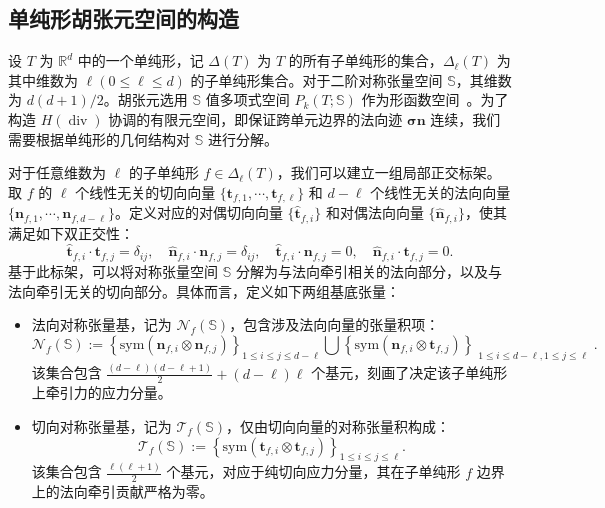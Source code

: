 \subsection{单纯形胡张元空间的构造}
\label{subsec:hz_space_construct}

设 $T$ 为 $\mathbb{R}^d$ 中的一个单纯形，记 $\Delta({T})$ 为 $T$ 的所有子单纯形的集合，$\Delta_{\ell}(T)$ 为其中维数为 $\ell(0\leq\ell\leq{d})$ 的子单纯形集合。对于二阶对称张量空间 $\mathbb{S}$，其维数为 $d(d+1)/2$。胡张元选用 $\mathbb{S}$ 值多项式空间 $P_k(T; \mathbb{S})$ 作为形函数空间~\cite{huFiniteElementApproximations2015}。为了构造 $H(\operatorname{div})$ 协调的有限元空间，即保证跨单元边界的法向迹 $\boldsymbol{\sigma}\boldsymbol{n}$ 连续，我们需要根据单纯形的几何结构对 $\mathbb{S}$ 进行分解。

对于任意维数为 $\ell$ 的子单纯形 $f \in \Delta_{\ell}(T)$，我们可以建立一组局部正交标架。取 $f$ 的 $\ell$ 个线性无关的切向向量 $\{\boldsymbol{t}_{f,1}, \cdots, \boldsymbol{t}_{f,\ell}\}$ 和 $d-\ell$ 个线性无关的法向向量 $\{\boldsymbol{n}_{f,1}, \cdots, \boldsymbol{n}_{f,d-\ell}\}$。定义对应的对偶切向向量 $\{\hat{\boldsymbol{t}}_{f,i}\}$ 和对偶法向向量 $\{\hat{\boldsymbol{n}}_{f,i}\}$，使其满足如下双正交性：
\[
\hat{\boldsymbol{t}}_{f, i} \cdot \boldsymbol{t}_{f, j} = \delta_{ij}, \quad \hat{\boldsymbol{n}}_{f, i} \cdot \boldsymbol{n}_{f, j} = \delta_{ij}, \quad \hat{\boldsymbol{t}}_{f, i} \cdot \boldsymbol{n}_{f, j} = 0, \quad \hat{\boldsymbol{n}}_{f, i} \cdot \boldsymbol{t}_{f, j} = 0.
\]
基于此标架，可以将对称张量空间 $\mathbb{S}$ 分解为与法向牵引相关的法向部分，以及与法向牵引无关的切向部分。具体而言，定义如下两组基底张量：
\begin{itemize}
	\item 法向对称张量基，记为 $\mathcal{N}_f(\mathbb{S})$，包含涉及法向向量的张量积项：
	\[
	\mathcal{N}_f(\mathbb{S}) := \left\{ \mathrm{sym}(\boldsymbol{n}_{f, i} \otimes \boldsymbol{n}_{f, j}) \right\}_{1 \leq i \leq j \leq d-\ell} \bigcup \left\{ \mathrm{sym}(\boldsymbol{n}_{f, i} \otimes \boldsymbol{t}_{f, j}) \right\}_{\substack{1 \leq i \leq d-\ell,1 \leq j \leq \ell}}.
	\]
	该集合包含 $\frac{(d-\ell)(d-\ell+1)}{2} + (d-\ell)\ell$ 个基元，刻画了决定该子单纯形上牵引力的应力分量。
	
	\item 切向对称张量基，记为 $\mathcal{T}_f(\mathbb{S})$，仅由切向向量的对称张量积构成：
	\[
	\mathcal{T}_f(\mathbb{S}) := \left\{ \mathrm{sym}(\boldsymbol{t}_{f, i} \otimes \boldsymbol{t}_{f, j}) \right\}_{1 \leq i \leq j \leq \ell}.
	\]
	该集合包含 $\frac{\ell(\ell+1)}{2}$ 个基元，对应于纯切向应力分量，其在子单纯形 $f$ 边界上的法向牵引贡献严格为零。
\end{itemize}
